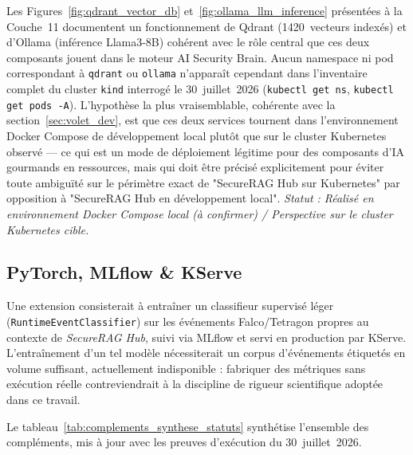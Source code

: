 Les Figures~\ref{fig:qdrant_vector_db} et~\ref{fig:ollama_llm_inference} présentées à la Couche~11 documentent un fonctionnement de Qdrant (1420~vecteurs indexés) et d'Ollama (inférence Llama3-8B) cohérent avec le rôle central que ces deux composants jouent dans le moteur AI Security Brain. Aucun namespace ni pod correspondant à \texttt{qdrant} ou \texttt{ollama} n'apparaît cependant dans l'inventaire complet du cluster \texttt{kind} interrogé le 30~juillet~2026 (\texttt{kubectl get ns}, \texttt{kubectl get pods -A}). L'hypothèse la plus vraisemblable, cohérente avec la section~\ref{sec:volet_dev}, est que ces deux services tournent dans l'environnement Docker Compose de développement local plutôt que sur le cluster Kubernetes observé — ce qui est un mode de déploiement légitime pour des composants d'IA gourmands en ressources, mais qui doit être précisé explicitement pour éviter toute ambiguïté sur le périmètre exact de "SecureRAG Hub sur Kubernetes" par opposition à "SecureRAG Hub en développement local". \textit{Statut : Réalisé en environnement Docker Compose local (à confirmer) / Perspective sur le cluster Kubernetes cible.}

\subsection{PyTorch, MLflow \& KServe}
Une extension consisterait à entraîner un classifieur supervisé léger (\texttt{RuntimeEventClassifier}) sur les événements Falco/Tetragon propres au contexte de \textit{SecureRAG Hub}, suivi via MLflow et servi en production par KServe. L'entraînement d'un tel modèle nécessiterait un corpus d'événements étiquetés en volume suffisant, actuellement indisponible : fabriquer des métriques sans exécution réelle contreviendrait à la discipline de rigueur scientifique adoptée dans ce travail.

\bigskip
Le tableau~\ref{tab:complements_synthese_statuts} synthétise l'ensemble des compléments, mis à jour avec les preuves d'exécution du 30~juillet~2026.

